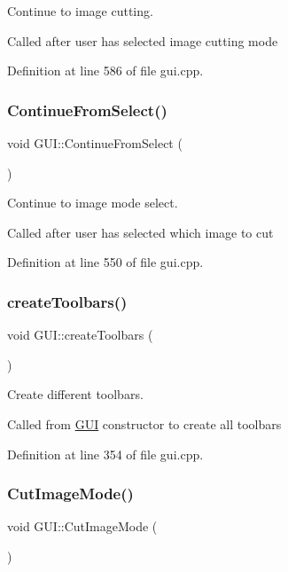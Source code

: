 Continue to image cutting. 

Called after user has selected image cutting mode 

Definition at line 586 of file gui.\+cpp.

\mbox{\label{classGUI_a0cddf3859f457495040857f4868f32e3}} 
\subsubsection{\texorpdfstring{Continue\+From\+Select()}{ContinueFromSelect()}}
{\footnotesize\ttfamily void G\+U\+I\+::\+Continue\+From\+Select (\begin{DoxyParamCaption}{ }\end{DoxyParamCaption})}



Continue to image mode select. 

Called after user has selected which image to cut 

Definition at line 550 of file gui.\+cpp.

\mbox{\label{classGUI_a26cdc4a989f3637301f0afb9cc5e23b0}} 
\subsubsection{\texorpdfstring{create\+Toolbars()}{createToolbars()}}
{\footnotesize\ttfamily void G\+U\+I\+::create\+Toolbars (\begin{DoxyParamCaption}{ }\end{DoxyParamCaption})}



Create different toolbars. 

Called from \mbox{\hyperlink{classGUI}{G\+UI}} constructor to create all toolbars 

Definition at line 354 of file gui.\+cpp.

\mbox{\label{classGUI_ae8acfcce2ea4da241c920076b72f1c93}} 
\subsubsection{\texorpdfstring{Cut\+Image\+Mode()}{CutImageMode()}}
{\footnotesize\ttfamily void G\+U\+I\+::\+Cut\+Image\+Mode (\begin{DoxyParamCaption}{ }\end{DoxyParamCaption})}



